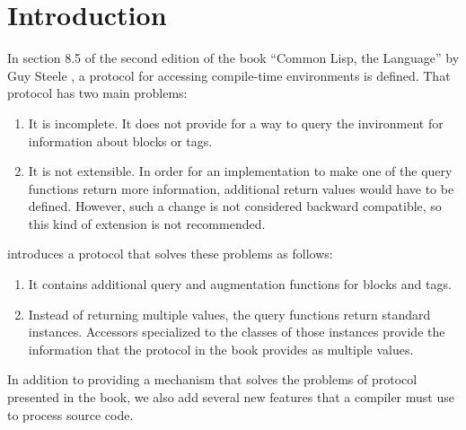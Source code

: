 \chapter{Introduction}
%

In section 8.5 of the second edition of the book ``Common Lisp, the
Language'' by Guy Steele \cite{Steele:1990:CLL:95411}, a protocol for
accessing compile-time environments is defined.  That protocol has
two main problems:

\begin{enumerate}
\item It is incomplete.  It does not provide for a way to query the
  invironment for information about blocks or tags.
\item It is not extensible.  In order for an implementation to make
  one of the query functions return more information, additional
  return values would have to be defined.  However, such a change is
  not considered backward compatible, so this kind of extension is not
  recommended.
\end{enumerate}

\sysname{} introduces a protocol that solves these problems as
follows:

\begin{enumerate}
\item It contains additional query and augmentation functions for
  blocks and tags.
\item Instead of returning multiple values, the query functions return
  standard instances.  Accessors specialized to the classes of those
  instances provide the information that the protocol in the book
  provides as multiple values.
\end{enumerate}

In addition to providing a mechanism that solves the problems of
protocol presented in the book, we also add several new features that
a compiler must use to process source code.

